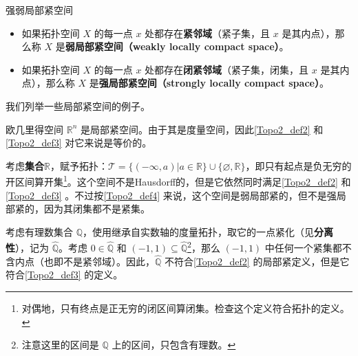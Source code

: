 \begin{definition}{强弱局部紧空间}\label{Topo2_def4}
\begin{itemize}
\item 如果拓扑空间 $X$ 的每一点 $x$ 处都存在\textbf{紧邻域}（紧子集，且 $x$ 是其内点），那么称 $X$ 是\textbf{弱局部紧空间（weakly locally compact space）}。
\item 如果拓扑空间 $X$ 的每一点 $x$ 处都存在\textbf{闭紧邻域}（紧子集，闭集，且 $x$ 是其内点），那么称 $X$ 是\textbf{强局部紧空间（strongly locally compact space）}。
\end{itemize}
\end{definition}

我们列举一些局部紧空间的例子。

\begin{example}{}
欧几里得空间 $\mathbb{R}^n$ 是局部紧空间。由于其是度量空间，因此\autoref{Topo2_def2} 和\autoref{Topo2_def3} 对它来说是等价的。
\end{example}

\begin{example}{}
考虑\textbf{集合}$\mathbb{R}$，赋予拓扑：$\mathcal{T}=\{(-\infty, a)|a\in\mathbb{R}\}\cup\{\varnothing, \mathbb{R}\}$，即只有起点是负无穷的开区间算开集\footnote{对偶地，只有终点是正无穷的闭区间算闭集。检查这个定义符合拓扑的定义。}。这个空间不是Hausdorff的，但是它依然同时满足\autoref{Topo2_def2} 和\autoref{Topo2_def3} 。不过按\autoref{Topo2_def4} 来说，这个空间是弱局部紧的，但不是强局部紧的，因为其闭集都不是紧集。
\end{example}

\begin{example}{}
考虑有理数集合 $\mathbb{Q}$，使用继承自实数轴的度量拓扑，取它的一点紧化（见\textbf{分离性}），记为 $\hat{\mathbb{Q}}$。考虑 $0\in\hat{\mathbb{Q}}$ 和 $(-1, 1)\subseteq\hat{\mathbb{Q}}$\footnote{注意这里的区间是 $\mathbb{Q}$ 上的区间，只包含有理数。}，那么 $(-1, 1)$ 中任何一个紧集都不含内点（也即不是紧邻域）。因此，$\hat{\mathbb{Q}}$ 不符合\autoref{Topo2_def2} 的局部紧定义，但是它符合\autoref{Topo2_def3} 的定义。
\end{example}












